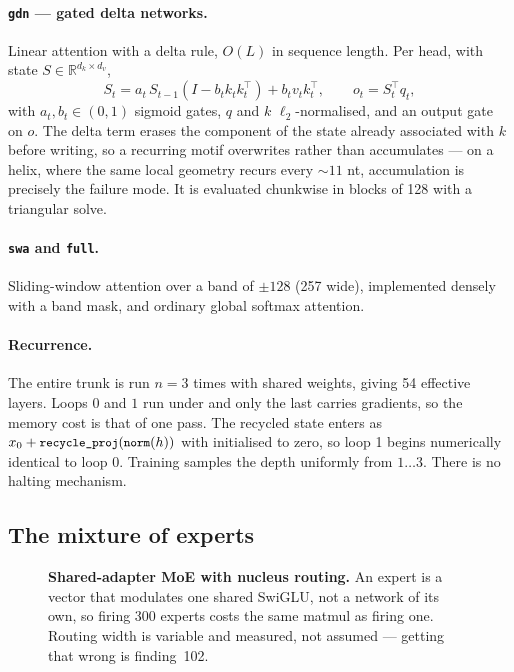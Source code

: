 \documentclass[11pt,a4paper]{article}
\begin{document}
\paragraph{\texttt{gdn} --- gated delta networks.} Linear attention with a
delta rule, $O(L)$ in sequence length. Per head, with state
$S \in \mathbb{R}^{d_k \times d_v}$,
\begin{equation}
S_t = a_t\,S_{t-1}\!\left(I - b_t k_t k_t^{\!\top}\right) + b_t v_t k_t^{\!\top},
\qquad o_t = S_t^{\!\top} q_t ,
\end{equation}
with $a_t,b_t \in (0,1)$ sigmoid gates, $q$ and $k$ $\ell_2$-normalised,
and an output gate on $o$. The delta term erases the component of the
state already associated with $k$ before writing, so a recurring motif
overwrites rather than accumulates --- on a helix, where the same local
geometry recurs every ${\sim}11$ nt, accumulation is precisely the
failure mode. It is evaluated chunkwise in blocks of 128 with a
triangular solve.

\paragraph{\texttt{swa} and \texttt{full}.} Sliding-window attention over
a band of $\pm128$ (257 wide), implemented densely with a band mask, and
ordinary global softmax attention.

\paragraph{Recurrence.} The entire trunk is run $n=3$ times with shared
weights, giving 54 effective layers. Loops $0$ and $1$ run under
 and only the last carries gradients, so the memory cost
is that of one pass. The recycled state enters as
$x_0 + \texttt{\small recycle\_proj}(\texttt{\small norm}(h))$ with 
initialised to zero, so loop 1 begins numerically identical to loop 0.
Training samples the depth uniformly from $1\ldots3$. There is no halting
mechanism.

\subsection{The mixture of experts}

\begin{figure}[H]\centering
\resizebox{0.98\textwidth}{!}{}
\caption{\textbf{Shared-adapter MoE with nucleus routing.} An expert is a
vector that modulates one shared SwiGLU, not a network of its own, so
firing 300 experts costs the same matmul as firing one. Routing width is
variable and measured, not assumed --- getting that wrong is
finding~102.}
\label{fig:moe}
\end{figure}
\end{document}
